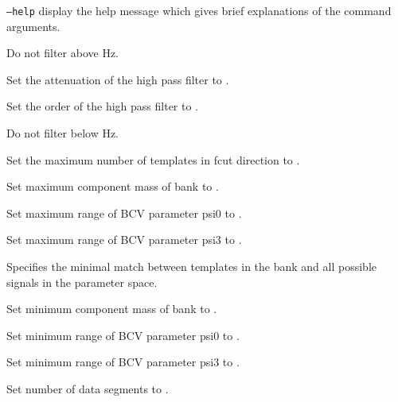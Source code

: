 \begin{entry}
\item[\texttt{--help}] display the help message which gives brief explanations
of the command arguments.  

\item[\option{--high-frequency-cutoff} \parm{cuthigh}] 
Do not filter above  Hz.

\item[\option{--high-pass-attenuation} \parm{high\_atten}] 
Set the attenuation of the high pass filter to .

\item[\option{--high-pass-order} \parm{high\_order}] 
Set the order of the high pass filter to .

\item[\option{--low-frequency-cutoff} \parm{cutlow}] 
Do not filter below  Hz.

\item[\option{-maximum-fcut-tmplts} \parm{ maxTemp}] 
Set the maximum number of templates in fcut direction to .

\item[\option{--maximum-mass} \parm{maxmass}] 
Set maximum component mass of bank to .

\item[\option{--maximum-psi0} \parm{psi0max}] 
Set maximum range of BCV parameter psi0 to .

\item[\option{--maximum-psi3} \parm{psi3max}] 
Set maximum range of BCV parameter psi3 to  .

\item[\option{--minimal-match} \parm{match}] 
Specifies the minimal match  between templates in the 
bank and all possible signals in the parameter space.

\item[\option{--minimum-mass} \parm{minmass}] 
Set minimum component mass of bank to .

\item[\option{--minimum-psi0} \parm{psi0min}] 
Set minimum range of BCV parameter psi0 to .

\item[\option{--minimum-psi3} \parm{psi3min}] 
Set minimum range of BCV parameter psi3 to .

\item[\option{--number-of-segments} \parm{segnum}] 
Set number of data segments to .


\end{entry}

